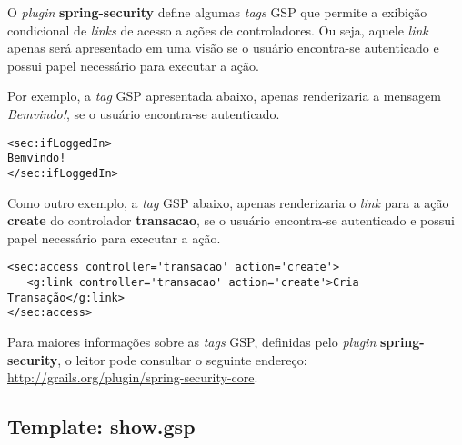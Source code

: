 O {\it plugin} {\bf spring-security} define algumas {\it tags} GSP que permite a
exibição  condicional de {\it  links} de  acesso a  ações de  controladores.  Ou
seja,  aquele {\it  link} apenas  será  apresentado em  uma visão  se o  usuário
encontra-se autenticado e possui papel necessário para executar a ação.

\vspace{0.2cm}

Por exemplo, a {\it tag}  GSP {\bf <sec: ifLoggedin>} apresentada abaixo, apenas
renderizaria a mensagem {\em Bemvindo!}, se o usuário encontra-se autenticado.

\vspace{0.3cm}

\begin{cBox}
\begin{footnotesize}
\begin{verbatim}
<sec:ifLoggedIn>
Bemvindo!
</sec:ifLoggedIn>
\end{verbatim}
\end{footnotesize}
\end{cBox}

\vspace{0.3cm}

Como  outro  exemplo,  a  {\it  tag}  GSP {\bf  <sec:  access>}  abaixo,  apenas
renderizaria  o  {\it  link}  para  a  ação {\bf  create}  do  controlador  {\bf
  transacao},  se o usuário  encontra-se autenticado  e possui  papel necessário
para executar a ação.  

\vspace{0.3cm}

\begin{cBox}
\begin{footnotesize}
\begin{verbatim}
<sec:access controller='transacao' action='create'>
   <g:link controller='transacao' action='create'>Cria Transação</g:link>
</sec:access>
\end{verbatim}
\end{footnotesize}
\end{cBox}

\vspace{0.3cm}

Para maiores  informações sobre as {\it  tags} GSP, definidas  pelo {\it plugin}
{\bf   spring-security},  o   leitor   pode  consultar   o  seguinte   endereço:
\url{http://grails.org/plugin/spring-security-core}. 

\subsection{Template: show.gsp}

